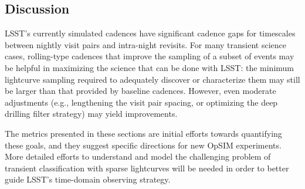 

\subsection{Discussion}
\label{sec:\chpname:discussion}

LSST's currently simulated cadences have significant cadence gaps for
timescales between nightly visit pairs and intra-night revisits.
For many transient science cases, rolling-type cadences that improve the
sampling of a subset of events may be helpful in maximizing the science
that can be done with LSST: the minimum lightcurve sampling required to
adequately discover or characterize them may still be larger than that
provided by baseline cadences.  However, even moderate adjustments (e.g.,
lengthening the visit pair spacing, or optimizing the deep drilling filter
strategy) may yield improvements.

The metrics presented in these sections are initial efforts towards
quantifying these goals, and they suggest specific directions for new OpSIM
experiments.  More detailed efforts to understand and model
the challenging problem
of transient classification with sparse lightcurves will be needed in order
to better guide LSST's time-domain observing strategy.


% 








% 


% 


% 






